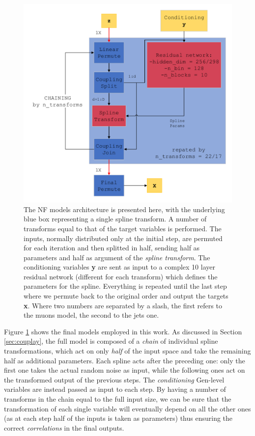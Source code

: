 \begin{figure}
    \centering
    \includegraphics[width=\columnwidth]{gfx/ch5/nfmodel.pdf}
    \caption[Actual NF model]{The NF models architecture is presented here, with the underlying blue box representing a single spline transform. A number of transforms equal to that of the target variables is performed. The inputs, normally distributed only at the initial step, are permuted for each iteration and then splitted in half, sending half as parameters and half as argument of the \emph{spline transform}. The conditioning variables \textbf{y} are sent as input to a complex 10 layer residual network (different for each transform) which defines the parameters for the spline. Everything is repeated until the last step where we permute back to the original order and output the targets \textbf{x}. Where two numbers are separated by a slash, the first refers to the muons model, the second to the jets one.}
    \label{fig:nfmodel}
\end{figure}

Figure \ref{fig:nfmodel} shows the final models employed in this work. 
As discussed in Section \ref{sec:couplay}, the full model is composed of a \emph{chain} of individual spline transformations, which act on only \emph{half} of the input space and take the remaining half as additional parameters. Each spline acts after the preceding one: only the first one takes the actual random noise as input, while the following ones act on the transformed output of the previous steps. The \emph{conditioning} Gen-level variables are instead passed as input to each step. By having a number of transforms in the chain equal to the full input size, we can be sure that the transformation of each single variable will eventually depend on all the other ones (as at each step half of the inputs is taken as parameters) thus ensuring the correct \emph{correlations} in the final outputs.

